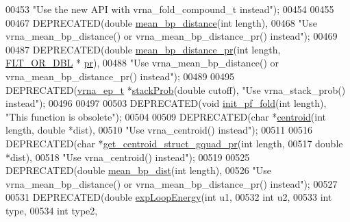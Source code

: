 \begin{DoxyCode}
00453 \textcolor{stringliteral}{"Use the new API with vrna\_fold\_compound\_t instead"});
00454 
00455 
00467 DEPRECATED(\textcolor{keywordtype}{double}  \hyperlink{group__pf__fold_ga79cbc375af65f11609feb6b055269e7d}{mean\_bp\_distance}(\textcolor{keywordtype}{int} length),
00468 \textcolor{stringliteral}{"Use vrna\_mean\_bp\_distance() or vrna\_mean\_bp\_distance\_pr() instead"});
00469 
00487 DEPRECATED(\textcolor{keywordtype}{double} \hyperlink{group__pf__fold_gad5ba36cef8d01cf4244cc09b9bf1ce1d}{mean\_bp\_distance\_pr}(\textcolor{keywordtype}{int} length, \hyperlink{group__data__structures_ga31125aeace516926bf7f251f759b6126}{FLT\_OR\_DBL} *
      \hyperlink{fold__vars_8h_ac98ec419070aee6831b44e5c700f090f}{pr}),
00488 \textcolor{stringliteral}{"Use vrna\_mean\_bp\_distance() or vrna\_mean\_bp\_distance\_pr() instead"});
00489 
00495 DEPRECATED(\hyperlink{group__struct__utils_structvrna__elem__prob__s}{vrna\_ep\_t} *\hyperlink{part__func_8h_a8f18624bcd0b47d1a266d9e5527e5362}{stackProb}(\textcolor{keywordtype}{double} cutoff), \textcolor{stringliteral}{"Use vrna\_stack\_prob() instead"});
00496 
00497 
00503 DEPRECATED(\textcolor{keywordtype}{void} \hyperlink{part__func_8h_a15176e23eceeff8c7d14eabcfec8a2af}{init\_pf\_fold}(\textcolor{keywordtype}{int} length), \textcolor{stringliteral}{"This function is obsolete"});
00504 
00509 DEPRECATED(\textcolor{keywordtype}{char} *\hyperlink{part__func_8h_ae89a63bd83e75a80b2ba36d20b31ce81}{centroid}(\textcolor{keywordtype}{int} length, \textcolor{keywordtype}{double} *dist),
00510 \textcolor{stringliteral}{"Use vrna\_centroid() instead"});
00511 
00516 DEPRECATED(\textcolor{keywordtype}{char} *\hyperlink{part__func_8h_a4e99e951dfdc006fe56c3a59374378ed}{get\_centroid\_struct\_gquad\_pr}(\textcolor{keywordtype}{int} length,
00517                                   \textcolor{keywordtype}{double} *dist),
00518 \textcolor{stringliteral}{"Use vrna\_centroid() instead"});
00519 
00525 DEPRECATED(\textcolor{keywordtype}{double} \hyperlink{part__func_8h_ae9556ba7ded44fe2321b6f67c3fc02a3}{mean\_bp\_dist}(\textcolor{keywordtype}{int} length),
00526 \textcolor{stringliteral}{"Use vrna\_mean\_bp\_distance() or vrna\_mean\_bp\_distance\_pr() instead"});
00527 
00531 DEPRECATED(\textcolor{keywordtype}{double} \hyperlink{part__func_8h_a68ba6f3a48e08ca131ab54621ce3a2d7}{expLoopEnergy}(\textcolor{keywordtype}{int} u1,
00532                                 \textcolor{keywordtype}{int} u2,
00533                                 \textcolor{keywordtype}{int} type,
00534                                 \textcolor{keywordtype}{int} type2,

\end{DoxyCode}
